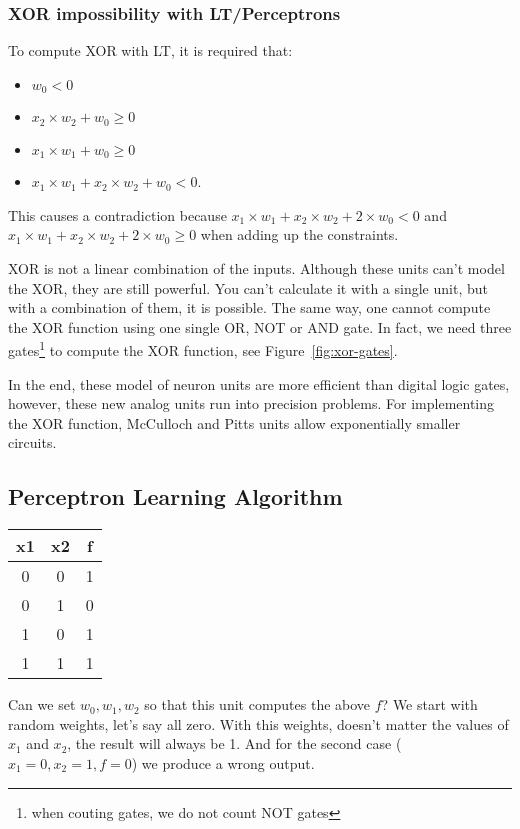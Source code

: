 \documentclass[main]{subfiles}
\begin{document}
\subsubsection{XOR impossibility with LT/Perceptrons}
To compute XOR with LT, it is required that:

\begin{itemize}[noitemsep,nolistsep]
	\item $w_0 < 0$
	\item $x_2 \times w_2 + w_0 \geq 0$
	\item $x_1 \times w_1 + w_0 \geq 0$
	\item $x_1 \times w_1 + x_2 \times w_2 + w_0 < 0$.
\end{itemize}

This causes a contradiction because $x_1 \times w_1 + x_2 \times w_2 + 2 \times w_0 < 0$ and $x_1 \times w_1 + x_2 \times w_2 + 2 \times w_0 \geq 0$ when adding up the constraints.

XOR is not a linear combination of the inputs.
Although these units can't model the XOR, they are still powerful.
You can't calculate it with a single unit, but with a combination of them, it is possible.
The same way, one cannot compute the XOR function using one single OR, NOT or AND gate.
In fact, we need three gates\footnote{when couting gates, we do not count NOT gates} to compute the XOR function, see Figure~\ref{fig:xor-gates}.

In the end, these model of neuron units are more efficient than digital logic gates, however, these new analog units run into precision problems.
For implementing the XOR function, McCulloch and Pitts units allow exponentially smaller circuits.

\subsection{Perceptron Learning Algorithm}

\begin{table}[H]
\begin{tabular}{cc|c}
x1 & x2 & f \\ 
\hline
0  & 0  & 1 \\
0  & 1  & 0 \\
1  & 0  & 1 \\
1  & 1  & 1 \\ 
\end{tabular}
\end{table}

Can we set $w_0, w_1, w_2$ so that this unit computes the above $f$?
We start with random weights, let's say all zero.
With this weights, doesn't matter the values of $x_1$ and $x_2$, the result will always be 1.
And for the second case ($x_1 = 0, x_2 = 1, f = 0$) we produce a wrong output.
\end{document}
